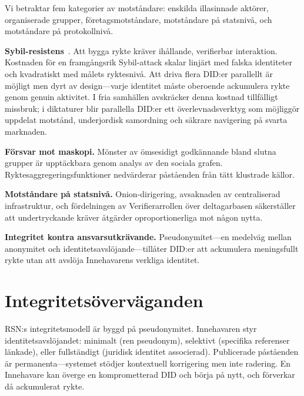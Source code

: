 \documentclass[11pt,a4paper,twocolumn]{article}
\begin{document}
Vi betraktar fem kategorier av motståndare: enskilda illasinnade aktörer, organiserade grupper, företagsmotståndare, motståndare på statsnivå, och motståndare på protokollnivå.

\textbf{Sybil-resistens}~\cite{douceur2002}. Att bygga rykte kräver ihållande, verifierbar interaktion. Kostnaden för en framgångsrik Sybil-attack skalar linjärt med falska identiteter och kvadratiskt med målets ryktesnivå. Att driva flera DID:er parallellt är möjligt men dyrt av design---varje identitet måste oberoende ackumulera rykte genom genuin aktivitet. I fria samhällen avskräcker denna kostnad tillfälligt missbruk; i diktaturer blir parallella DID:er ett överlevnadsverktyg som möjliggör uppdelat motstånd, underjordisk samordning och säkrare navigering på svarta marknaden.

\textbf{Försvar mot maskopi.} Mönster av ömsesidigt godkännande bland slutna grupper är upptäckbara genom analys av den sociala grafen. Ryktesaggregeringsfunktioner nedvärderar påståenden från tätt klustrade källor.

\textbf{Motståndare på statsnivå.} Onion-dirigering, avsaknaden av centraliserad infrastruktur, och fördelningen av Verifierarrollen över deltagarbasen säkerställer att undertryckande kräver åtgärder oproportionerliga mot någon nytta.

\textbf{Integritet kontra ansvarsutkrävande.} Pseudonymitet---en medelväg mellan anonymitet och identitetsavslöjande---tillåter DID:er att ackumulera meningsfullt rykte utan att avslöja Innehavarens verkliga identitet.

\section{Integritetsöverväganden}

RSN:s integritetsmodell är byggd på pseudonymitet. Innehavaren styr identitetsavslöjandet: minimalt (ren pseudonym), selektivt (specifika referenser länkade), eller fullständigt (juridisk identitet associerad). Publicerade påståenden är permanenta---systemet stödjer kontextuell korrigering men inte radering. En Innehavare kan överge en komprometterad DID och börja på nytt, och förverkar då ackumulerat rykte.

\end{document}

